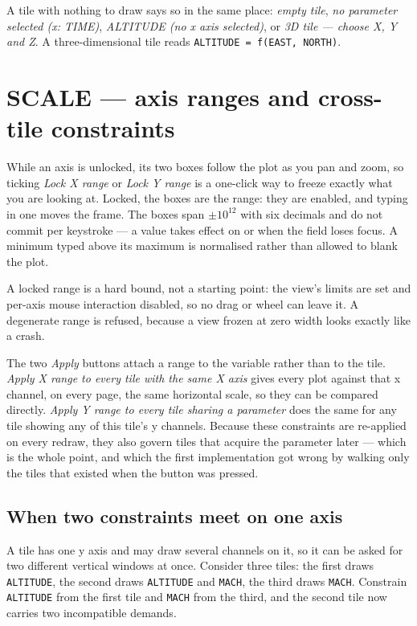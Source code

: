 \documentclass[11pt,a4paper,oneside]{report}
\newcommand{\code}[1]{\texttt{#1}}
\newcommand{\key}[1]{\textsf{\small\fbox{#1}}}
\begin{document}
A tile with nothing to draw says so in the same place: \emph{empty tile},
\emph{no parameter selected (x: TIME)}, \emph{ALTITUDE (no x axis selected)}, or
\emph{3D tile --- choose X, Y and Z}. A three-dimensional tile reads
\code{ALTITUDE = f(EAST, NORTH)}.

\section{SCALE --- axis ranges and cross-tile constraints}

While an axis is unlocked, its two boxes follow the plot as you pan and zoom, so
ticking \emph{Lock X range} or \emph{Lock Y range} is a one-click way to freeze
exactly what you are looking at. Locked, the boxes are the range: they are
enabled, and typing in one moves the frame. The boxes span $\pm 10^{12}$ with six
decimals and do not commit per keystroke --- a value takes effect on
\key{Enter} or when the field loses focus. A minimum typed above its maximum is
normalised rather than allowed to blank the plot.

A locked range is a hard bound, not a starting point: the view's limits are set
and per-axis mouse interaction disabled, so no drag or wheel can leave it. A
degenerate range is refused, because a view frozen at zero width looks exactly
like a crash.

The two \emph{Apply} buttons attach a range to the variable rather than to the
tile. \emph{Apply X range to every tile with the same X axis} gives every plot
against that x channel, on every page, the same horizontal scale, so they can be
compared directly. \emph{Apply Y range to every tile sharing a parameter} does
the same for any tile showing any of this tile's y channels. Because these
constraints are re-applied on every redraw, they also govern tiles that acquire
the parameter later --- which is the whole point, and which the first
implementation got wrong by walking only the tiles that existed when the button
was pressed.

\subsection{When two constraints meet on one axis}

A tile has one y axis and may draw several channels on it, so it can be asked for
two different vertical windows at once. Consider three tiles: the first draws
\code{ALTITUDE}, the second draws \code{ALTITUDE} and \code{MACH}, the third
draws \code{MACH}. Constrain \code{ALTITUDE} from the first tile and \code{MACH}
from the third, and the second tile now carries two incompatible demands.
\end{document}
